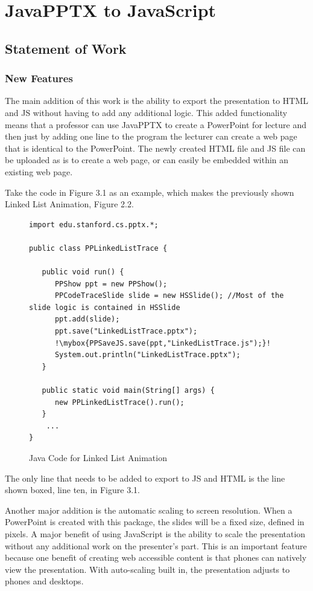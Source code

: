\documentclass[12pt,twoside]{reedthesis}
\newcommand{\mybox}{%
    \collectbox{%
        \setlength{\fboxsep}{2pt}%
        \fbox{\BOXCONTENT}%
    }%
}
\begin{document}
\chapter{JavaPPTX to JavaScript}

\section{Statement of Work}

\subsection{New Features}
The main addition of this work is the ability to export the presentation to HTML and JS without having to add any additional logic. This added functionality means that a professor can use JavaPPTX to create a PowerPoint for lecture and then just by adding one line to the program the lecturer can create a web page that is identical to the PowerPoint. The newly created HTML file and JS file can be uploaded as is to create a web page, or can easily be embedded within an existing web page. 

Take the code in Figure 3.1 as an example, which makes the previously shown Linked List Animation, Figure 2.2.
\begin{figure}[h!tbp]
\caption{Java Code for Linked List Animation} 
\begin{lstlisting}[escapechar=!]
import edu.stanford.cs.pptx.*;

public class PPLinkedListTrace {

   public void run() {
      PPShow ppt = new PPShow();
      PPCodeTraceSlide slide = new HSSlide(); //Most of the slide logic is contained in HSSlide
      ppt.add(slide);
      ppt.save("LinkedListTrace.pptx");
      !\mybox{PPSaveJS.save(ppt,"LinkedListTrace.js");}!
      System.out.println("LinkedListTrace.pptx");
   }

   public static void main(String[] args) {
      new PPLinkedListTrace().run();
   }
	...
}
\end{lstlisting}
\end{figure}
The only line that needs to be added to export to JS and HTML is the line shown boxed, line ten, in Figure 3.1.

Another major addition is the automatic scaling to screen resolution. When a PowerPoint is created with this package, the slides will be a fixed size, defined in pixels. A major benefit of using JavaScript is the ability to scale the presentation without any additional work on the presenter's part. This is an important feature because one benefit of creating web accessible content is that phones can natively view the presentation. With auto-scaling built in, the presentation adjusts to phones and desktops. 
\end{document}
